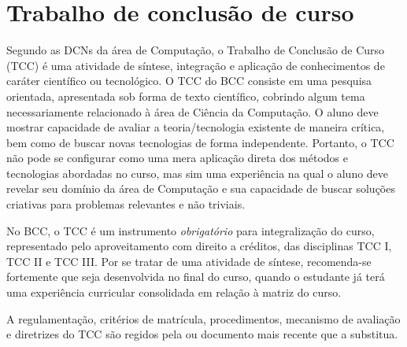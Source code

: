 \section{Trabalho de conclusão de curso}
\label{sec:trabalho_conclusao_curso}

Segundo as DCNs da área de Computação, o Trabalho de Conclusão de Curso (TCC) é
uma atividade de síntese, integração e aplicação de conhecimentos de caráter
científico ou tecnológico. 
O TCC do BCC consiste em uma pesquisa orientada, apresentada sob forma de texto
científico, cobrindo algum tema necessariamente relacionado à área de Ciência
da Computação. 
O aluno deve mostrar capacidade de avaliar a teoria/tecnologia existente de
maneira crítica, bem como de buscar novas tecnologias de forma independente.
Portanto, o TCC não pode se configurar como uma mera aplicação direta dos
métodos e tecnologias abordadas no curso, mas sim uma experiência na qual o
aluno deve revelar seu domínio da área de Computação e sua capacidade de buscar
soluções criativas para problemas relevantes e não triviais.


No BCC, o TCC é um instrumento \textit{obrigatório} para integralização do
curso, representado pelo aproveitamento com direito a créditos, das disciplinas
TCC I, TCC II e TCC III.
Por se tratar de uma atividade de síntese, recomenda-se fortemente que seja
desenvolvida no final do curso, quando o estudante já terá uma experiência
curricular consolidada em relação à matriz do curso.

A regulamentação, critérios de matrícula, procedimentos, mecanismo de avaliação
e diretrizes do TCC são regidos pela  ou documento
mais recente que a substitua. 
